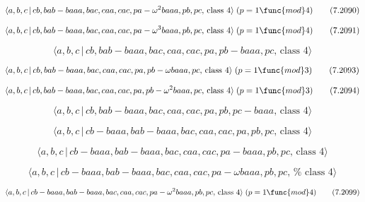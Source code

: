 \documentclass[10pt]{article}
\begin{document}
\begin{equation}
\langle a,b,c\,|\,cb,bab-baaa,bac,caa,cac,pa-\omega ^{2}baaa,pb,pc,\,\text{%
class }4\rangle \;(p=1\func{mod}4)  \tag{7.2090}
\end{equation}

\begin{equation}
\langle a,b,c\,|\,cb,bab-baaa,bac,caa,cac,pa-\omega ^{3}baaa,pb,pc,\,\text{%
class }4\rangle \;(p=1\func{mod}4)  \tag{7.2091}
\end{equation}

\begin{equation}
\langle a,b,c\,|\,cb,bab-baaa,bac,caa,cac,pa,pb-baaa,pc,\,\text{class }%
4\rangle  \tag{7.2092}
\end{equation}

\begin{equation}
\langle a,b,c\,|\,cb,bab-baaa,bac,caa,cac,pa,pb-\omega baaa,pc,\,\text{class 
}4\rangle \;(p=1\func{mod}3)  \tag{7.2093}
\end{equation}

\begin{equation}
\langle a,b,c\,|\,cb,bab-baaa,bac,caa,cac,pa,pb-\omega ^{2}baaa,pc,\,\text{%
class }4\rangle \;(p=1\func{mod}3)  \tag{7.2094}
\end{equation}

\begin{equation}
\langle a,b,c\,|\,cb,bab-baaa,bac,caa,cac,pa,pb,pc-baaa,\,\text{class }%
4\rangle  \tag{7.2095}
\end{equation}

\begin{equation}
\langle a,b,c\,|\,cb-baaa,bab-baaa,bac,caa,cac,pa,pb,pc,\,\text{class }%
4\rangle  \tag{7.2096}
\end{equation}

\begin{equation}
\langle a,b,c\,|\,cb-baaa,bab-baaa,bac,caa,cac,pa-baaa,pb,pc,\,\text{class }%
4\rangle  \tag{7.2097}
\end{equation}

\begin{equation}
\langle a,b,c\,|\,cb-baaa,bab-baaa,bac,caa,cac,pa-\omega baaa,pb,pc,\,\text{%
class }4\rangle  \tag{7.2098}
\end{equation}

\begin{equation}
\langle a,b,c\,|\,cb-baaa,bab-baaa,bac,caa,cac,pa-\omega ^{2}baaa,pb,pc,\,%
\text{class }4\rangle \;(p=1\func{mod}4)  \tag{7.2099}
\end{equation}
\end{document}

